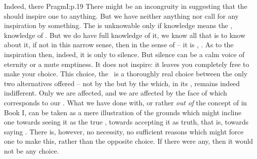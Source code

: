 Indeed, there \citet{can be no greater incongruity than [for a disciple of
  Spencer] to proclaim with one breath that the substance of things is
  unknowable, and with the next that the thought of it should inspire us with
  awe, reverence, and a willingness to add our co-operative push in the
  direction toward which its manifestations seem to be
  drifting.}{Pragm}{I;p.19} There might be an incongruity in suggesting that the
 should inspire one to anything. But we have neither anything
 nor call for any inspiration by something. The 
is unknowable only if knowledge means the  , knowledge
of . But we do have full knowledge of it, we know all that is to know
about it, if not in this narrow sense, then in the sense of  -- it is
, . As to the inspiration then,
indeed, it is only to silence. But silence can be a calm voice of eternity or a
mute emptiness. It does not inspire: it leaves you completely free to make your
choice.  This choice, the \sch\ is a thoroughly real {choice} between the only
two alternatives offered -- not by the  but by the 
which, in its , remains indeed indifferent. Only we are
affected, and we are affected by  the face of  which
corresponds to our .  What we have done with, or rather {\em out of}
the concept of  in Book I, can be taken as a mere illustration of
the grounds which might incline one towards seeing it as the true ,
towards accepting it as truth, that is, towards saying \yes. There is, however,
no necessity, no sufficient reasons which might force one to make this, rather
than the opposite choice. If there were any, then it would not be any choice.


